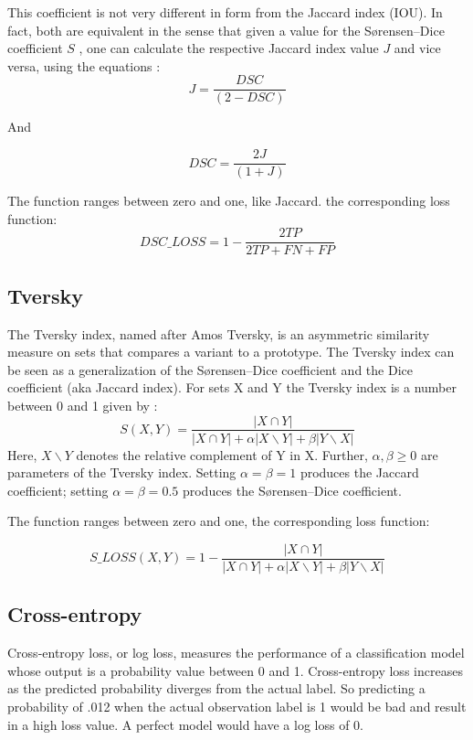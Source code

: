This coefficient is not very different in form from the Jaccard index (IOU). In fact, both are equivalent in the sense that given a value for the Sørensen–Dice coefficient $S$ , one can calculate the respective Jaccard index value $J$ and vice versa, using the equations : 
\begin{equation}
    J = \frac{DSC}{( 2 − DSC )}
\end{equation}

And 

\begin{equation}
    DSC = \frac{2 J }{( 1 + J )}
\end{equation}

The function ranges between zero and one, like Jaccard. the corresponding loss function:
\begin{equation}
    DSC\_LOSS = 1 - \frac{2 TP}{2 TP + FN + FP}
\end{equation}

\subsection{Tversky}
\hspace{\parindent}
The Tversky index, named after Amos Tversky, is an asymmetric similarity measure on sets that compares a variant to a prototype. The Tversky index can be seen as a generalization of the Sørensen–Dice coefficient and the Dice coefficient (aka Jaccard index).
For sets X and Y the Tversky index is a number between 0 and 1 given by :
\begin{equation}
    S(X, Y) = \frac{| X \cap Y |}{| X \cap Y | + \alpha|X ∖ Y| + \beta | Y ∖ X|}
\end{equation}
Here, $X ∖ Y$ denotes the relative complement of Y in X. 
Further, $\alpha , \beta \geq 0$ are parameters of the Tversky index. Setting $\alpha = \beta = 1$ produces the Jaccard coefficient; setting $\alpha = \beta = 0.5$ produces the Sørensen–Dice coefficient. 

The function ranges between zero and one, the corresponding loss function:

\begin{equation}
    S\_LOSS(X, Y) = 1 - \frac{| X \cap Y |}{| X \cap Y | + \alpha|X ∖ Y| + \beta | Y ∖ X|}
\end{equation}

\subsection{Cross-entropy}
\hspace{\parindent}
Cross-entropy loss, or log loss, measures the performance of a classification model whose output is a probability value between 0 and 1. Cross-entropy loss increases as the predicted probability diverges from the actual label. So predicting a probability of .012 when the actual observation label is 1 would be bad and result in a high loss value. A perfect model would have a log loss of 0.

